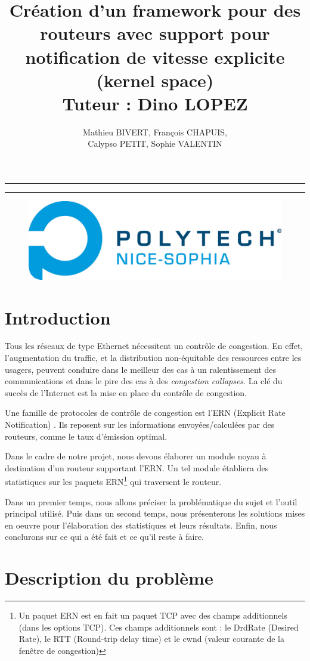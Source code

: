 \documentclass[a4paper]{article}
\title{Création d'un framework pour des routeurs
	avec support pour notification de vitesse explicite
	(kernel space)\\Tuteur : Dino LOPEZ}
\author{Mathieu BIVERT, François CHAPUIS, 
\\Calypso PETIT, Sophie VALENTIN}
\makeatletter
\def\maketitle{%
  \null
  \thispagestyle{empty}%
  \vskip 1cm
  \begin{center}
        \normalfont\large\huge\@author
  \end{center}
  \vfil
  \vfil
  \vfil
  \vfil
  \vfil
  \vfil
  \vfil
  \vfil
  \vfil
  \hrule height 2pt
  \par
  \begin{center}
        \huge \strut \@title \par
        \@date
  \end{center}
  \hrule height 2pt
  \par
  \vfil
  \vfil
  \vfil
  \vfil
  \vfil
  \vfil
  \vfil  
  \vfil  
  \vfil
  \vfil  
  \vfil
  \vfil
  \vfil
  \vfil  
  \vfil  
  \vfil
  \vfil  
  \vfil  
  \vfil
  \vfil
  \vfil
  \vfil
  \vfil
  \vfil
  \vfil
  \null
\begin{figure}[!ht]
        \centering
        \includegraphics[scale=.5]{polytech.png}
\end{figure}
\vfil
\cleardoublepage
}
\makeatother
\begin{document}
\maketitle

\newpage
\tableofcontents

\newpage
\section{Introduction}

Tous les réseaux de type Ethernet nécessitent un contrôle de congestion. En effet,
l'augmentation du traffic, et la distribution non-équitable des ressources 
entre les usagers, peuvent conduire dans le meilleur des cas à un
ralentissement des communications et dans le pire des cas à des \textit{congestion collapses}.
La clé du succès de l'Internet est la mise en place du contrôle de congestion.

Une famille de protocoles de contrôle de congestion est l'ERN
(Explicit Rate Notification) \cite{thesis1}. Ils reposent sur les informations
envoyées/calculées par des routeurs, comme le taux d'émission
optimal. 

Dans le cadre de notre projet, nous devons élaborer un
module noyau à destination d'un routeur supportant l'ERN.
Un tel module établiera des statistiques sur les paquets ERN\footnote{Un paquet ERN est en fait 
un paquet TCP avec des champs additionnels (dans les options TCP). Ces champs additionnels sont : 
le DrdRate (Desired Rate), le RTT (Round-trip delay time) et le cwnd (valeur courante de la fenêtre de congestion)}
qui traversent le routeur. 

Dans un premier temps, nous allons préciser
la problématique du sujet et l'outil principal utilisé. Puis dans un
second temps, nous présenterons les solutions mises en oeuvre pour 
l'élaboration des statistiques et leurs résultats. Enfin, nous conclurons sur ce qui a été fait
et ce qu'il reste à faire.

\section{Description du problème}
\end{document}
